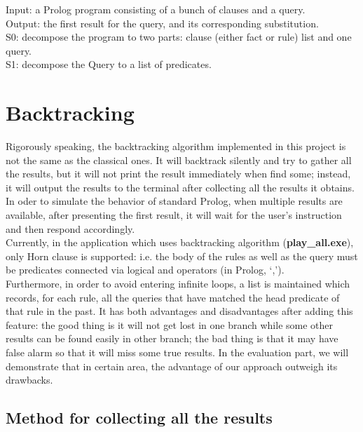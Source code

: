 \documentclass[11pt,a4paper]{report}
\begin{document}
Input: a Prolog program consisting of a bunch of clauses and a query. \\

Output: the first result for the query, and its corresponding substitution. \\

S0: decompose the program to two parts: clause (either fact or rule) list and one query.  \\

S1: decompose the Query to a list of predicates.



\section*{Backtracking}
Rigorously speaking, the backtracking algorithm implemented in this project is not the same as the classical ones. It will backtrack silently and try to
gather all the results, but it will not print the result immediately when find some; instead, it will output the results to the terminal after collecting all the results it obtains. In oder to simulate the behavior of standard Prolog, when multiple results are available, after presenting the first result, it will wait for the user's instruction and then respond accordingly.\\

Currently, in the application which uses backtracking algorithm (\textbf{play\_all.exe}), only Horn clause is supported: i.e. the body of the rules as well as the query must be predicates connected via logical and operators (in Prolog, `,').\\ Furthermore, in order to avoid entering infinite loops, a list is maintained which records, for each rule, all the queries that have matched the head predicate of that rule in the past. It has both advantages and disadvantages after adding this feature: the good thing is it will not get lost in one branch while some other results can be found easily in other branch; the bad thing is that it may have false alarm so that it will miss some true results. In the evaluation part, we will demonstrate that in certain area, the advantage of our approach outweigh its drawbacks.\\

\subsection*{Method for collecting all the results}
\end{document}
